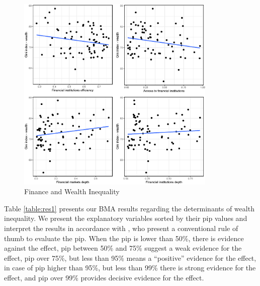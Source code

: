 \documentclass[a4paper,11pt]{article}
\begin{document}
\begin{figure}[ht]
	\caption{Finance and Wealth Inequality}
    \label{fig:findev}
    \begin{measuredfigure}
    \centering
	\includegraphics[width=0.85\textwidth, keepaspectratio]{figures/plots_findev.eps}
	\end{measuredfigure}
\end{figure}


Table \ref{table:res1} presents our BMA results regarding the determinants of wealth inequality. We present the explanatory variables sorted by their \ac{pip} values and interpret the results in accordance with \citet{kass1995bayes}, who present a conventional rule of thumb to evaluate the \ac{pip}. When the \ac{pip} is lower than 50\%, there is evidence against the effect, \ac{pip} between 50\% and 75\% suggest a weak evidence for the effect, \ac{pip} over 75\%, but less than 95\% means a “positive” evidence for the effect, in case of \ac{pip} higher than 95\%, but less than 99\% there is strong evidence for the effect, and \ac{pip} over 99\% provides decisive evidence for the effect.
\end{document}
